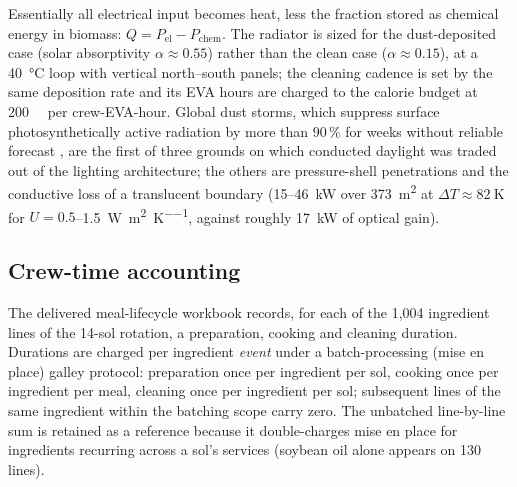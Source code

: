 \documentclass[11pt,a4paper,3p,authoryear]{elsarticle}
\begin{document}
Essentially all electrical input becomes heat, less the fraction stored as chemical energy in biomass: $Q = P_\mathrm{el} - P_\mathrm{chem}$. The radiator is sized for the dust-deposited case (solar absorptivity $\alpha \approx 0.55$) rather than the clean case ($\alpha \approx 0.15$), at a \SI{40}{\celsius} loop with vertical north--south panels; the cleaning cadence is set by the same deposition rate and its EVA hours are charged to the calorie budget at \SI{200}{\kilo\calorie} per crew-EVA-hour. Global dust storms, which suppress surface photosynthetically active radiation by more than 90\,\% for weeks without reliable forecast \citep{Zurek1993duststorms}, are the first of three grounds on which conducted daylight was traded out of the lighting architecture; the others are pressure-shell penetrations and the conductive loss of a translucent boundary (15--\SI{46}{\kilo\watt} over \SI{373}{\metre\squared} at $\Delta T \approx \SI{82}{\kelvin}$ for $U = 0.5$--\SI{1.5}{\watt\per\metre\squared\per\kelvin}, against roughly \SI{17}{\kilo\watt} of optical gain).

\subsection{Crew-time accounting}\label{sec:crewtime-method}

The delivered meal-lifecycle workbook records, for each of the 1,004 ingredient lines of the 14-sol rotation, a preparation, cooking and cleaning duration. Durations are charged per ingredient \emph{event} under a batch-processing (mise en place) galley protocol: preparation once per ingredient per sol, cooking once per ingredient per meal, cleaning once per ingredient per sol; subsequent lines of the same ingredient within the batching scope carry zero. The unbatched line-by-line sum is retained as a reference because it double-charges mise en place for ingredients recurring across a sol's services (soybean oil alone appears on 130 lines).
\end{document}

